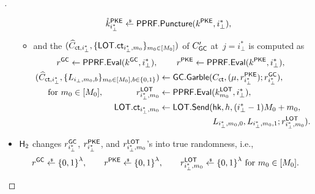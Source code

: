 \begin{proof}[]
\begin{itemize}
\begin{itemize}
\begin{align*}
\mathring{k}^\PKE_{i_\bot^\ast}&{}\draws\PPRF.\Puncture(k^\PKE,i_\bot^\ast),
\end{align*}
\item and the 
$(\widehat{C}_{\ct,i_\bot^\ast},\{\LOT.\ct_{i_\bot^\ast,m_0}\}_{m_0\in[M_0]})$
of $C_{\smash{\mathsf{GC}}}'$ at~${j=i_\bot^\ast}$
is computed as
\begin{align*}
r^\GC\gets\PPRF.\Eval(k^\GC,i_\bot^\ast),\ &\qquad
r^\PKE\gets\PPRF.\Eval(k^\PKE,i_\bot^\ast),\\
\WideNarrow{}{\hspace*{-1.4em}}
(\widehat{C}_{\ct,i_\bot^\ast},\{L_{i_\bot,m_0,b}\}_{m_0\in[M_0],b\in\bit})
&{}\gets\GC.\Garble(C_\ct,(\mu,r^\PKE_{i_\bot^\ast});r^\GC_{i_\bot^\ast}),\\
\mathllap{\textup{for }m_0\in[M_0],\qquad\qquad}
r^\LOT_{i_\bot^\ast,m_0}&{}\gets\PPRF.\Eval(k^\LOT_{m_0},i_\bot^\ast),\\
\LOT.\ct_{i_\bot^\ast,m_0}&{}\gets\LOT.\Send(\hk,h,(i_\bot^\ast-1)M_0+m_0,\\
&\hphantom{{}\gets\LOT.\Send({}}
L_{i_\bot^\ast,m_0,0},
L_{i_\bot^\ast,m_0,1};
r^\LOT_{i_\bot^\ast,m_0}).
\end{align*}
\end{itemize}
\item ${\smash{\mathsf{H}}}_2$ changes $r^\GC_{i_\bot^\ast}$, $r^\PKE_{i_\bot^\ast}$, and $r^\LOT_{i_\bot^\ast,m_0}$'s into true randomness, i.e.,
\begin{align*}
r^\GC\draws\bit^\lambda,\qquad
r^\PKE\draws\bit^\lambda,\qquad
r^\LOT_{i_\bot^\ast,m_0}\draws\bit^\lambda\textup{ for }m_0\in[M_0].
\end{align*}
\end{itemize}
\end{proof}

